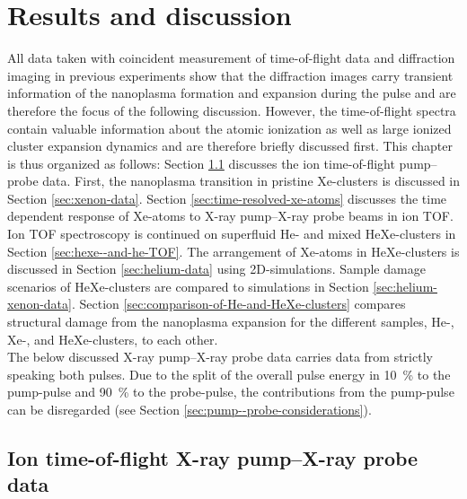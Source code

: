 \chapter{Results and discussion}\label{ch:results}
All data taken with coincident measurement of time-of-flight data and diffraction imaging in previous experiments \cite{Bostedt-2012-PRL} show that the diffraction images carry transient information of the nanoplasma formation and expansion during the pulse and are therefore the focus of the following discussion. However, the time-of-flight spectra contain valuable information about the atomic ionization as well as large ionized cluster expansion dynamics and are therefore briefly discussed first. This chapter is thus organized as follows: 
%
Section \ref{sec:itof-pump--probe} discusses the ion time-of-flight pump--probe data.
First, the nanoplasma transition in pristine Xe-clusters is discussed in Section \ref{sec:xenon-data}. Section \ref{sec:time-resolved-xe-atoms} discusses the time dependent response of Xe-atoms to X-ray pump--X-ray probe beams in ion TOF. Ion TOF spectroscopy is continued on superfluid He- and mixed HeXe-clusters in Section \ref{sec:hexe--and-he-TOF}. The arrangement of Xe-atoms in HeXe-clusters is discussed in Section \ref{sec:helium-data} using 2D-simulations. Sample damage scenarios of HeXe-clusters are compared to simulations in Section \ref{sec:helium-xenon-data}. Section \ref{sec:comparison-of-He-and-HeXe-clusters} compares structural damage from the nanoplasma expansion for the different samples, He-, Xe-, and HeXe-clusters, to each other.\\[1\baselineskip]
%
The below discussed X-ray pump--X-ray probe data carries data from strictly speaking both pulses. Due to the split of the overall pulse energy in \SI{10}{\percent} to the pump-pulse and \SI{90}{\percent} to the probe-pulse, the contributions from the pump-pulse can be disregarded (see Section \ref{sec:pump--probe-considerations}).
%
%
\section{Ion time-of-flight X-ray pump--X-ray probe data}\label{sec:itof-pump--probe}
